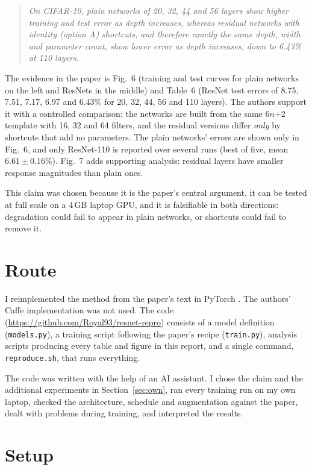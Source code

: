 \documentclass[conference]{IEEEtran}
\newcommand{\repo}{\url{https://github.com/Royal93/resnet-repro}}
\begin{document}
\begin{quote}
\emph{On CIFAR-10, plain networks of 20, 32, 44 and 56 layers show higher training and test error as depth increases, whereas residual networks with identity (option A) shortcuts, and therefore exactly the same depth, width and parameter count, show lower error as depth increases, down to 6.43\% at 110 layers.}
\end{quote}

The evidence in the paper is Fig.~6 (training and test curves for plain networks on the left and ResNets in the middle) and Table~6 (ResNet test errors of 8.75, 7.51, 7.17, 6.97 and 6.43\% for 20, 32, 44, 56 and 110 layers). The authors support it with a controlled comparison: the networks are built from the same 6$n$+2 template with 16, 32 and 64 filters, and the residual versions differ \emph{only} by shortcuts that add no parameters. The plain networks' errors are shown only in Fig.~6, and only ResNet-110 is reported over several runs (best of five, mean $6.61\pm0.16$\%). Fig.~7 adds supporting analysis: residual layers have smaller response magnitudes than plain ones.

This claim was chosen because it is the paper's central argument, it can be tested at full scale on a 4\,GB laptop GPU, and it is falsifiable in both directions: degradation could fail to appear in plain networks, or shortcuts could fail to remove it.

\section{Route}
\label{sec:route}
I reimplemented the method from the paper's text in PyTorch \cite{paszke2019pytorch}. The authors' Caffe \cite{jia2014caffe} implementation was not used. The code (\repo) consists of a model definition (\texttt{models.py}), a training script following the paper's recipe (\texttt{train.py}), analysis scripts producing every table and figure in this report, and a single command, \texttt{reproduce.sh}, that runs everything.

The code was written with the help of an AI assistant. I chose the claim and the additional experiments in Section~\ref{sec:own}, ran every training run on my own laptop, checked the architecture, schedule and augmentation against the paper, dealt with problems during training, and interpreted the results.

\section{Setup}
\label{sec:setup}
\end{document}
